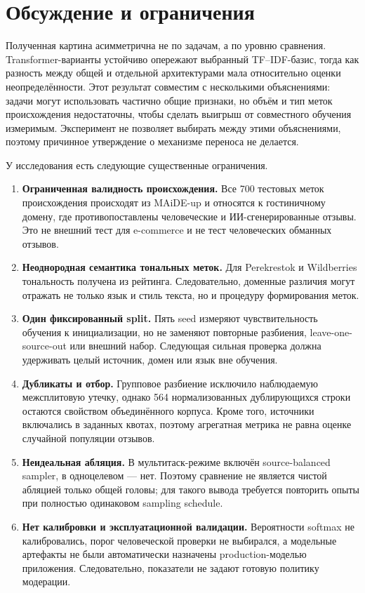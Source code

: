 \documentclass[11pt,a4paper]{article}
\begin{document}
\section{Обсуждение и ограничения}

Полученная картина асимметрична не по задачам, а по уровню сравнения. Transformer-варианты устойчиво опережают выбранный TF--IDF-базис, тогда как разность между общей и отдельной архитектурами мала относительно оценки неопределённости. Этот результат совместим с несколькими объяснениями: задачи могут использовать частично общие признаки, но объём и тип меток происхождения недостаточны, чтобы сделать выигрыш от совместного обучения измеримым. Эксперимент не позволяет выбирать между этими объяснениями, поэтому причинное утверждение о механизме переноса не делается.

У исследования есть следующие существенные ограничения.
\begin{enumerate}[leftmargin=0.65cm]
  \item \textbf{Ограниченная валидность происхождения.} Все 700 тестовых меток происхождения происходят из MAiDE-up и относятся к гостиничному домену, где противопоставлены человеческие и ИИ-сгенерированные отзывы. Это не внешний тест для e-commerce и не тест человеческих обманных отзывов.
  \item \textbf{Неоднородная семантика тональных меток.} Для Perekrestok и Wildberries тональность получена из рейтинга. Следовательно, доменные различия могут отражать не только язык и стиль текста, но и процедуру формирования меток.
  \item \textbf{Один фиксированный split.} Пять seed измеряют чувствительность обучения к инициализации, но не заменяют повторные разбиения, leave-one-source-out или внешний набор. Следующая сильная проверка должна удерживать целый источник, домен или язык вне обучения.
  \item \textbf{Дубликаты и отбор.} Групповое разбиение исключило наблюдаемую межсплитовую утечку, однако 564 нормализованных дублирующихся строки остаются свойством объединённого корпуса. Кроме того, источники включались в заданных квотах, поэтому агрегатная метрика не равна оценке случайной популяции отзывов.
  \item \textbf{Неидеальная абляция.} В мультитаск-режиме включён source-balanced sampler, в одноцелевом --- нет. Поэтому сравнение не является чистой абляцией только общей головы; для такого вывода требуется повторить опыты при полностью одинаковом sampling schedule.
  \item \textbf{Нет калибровки и эксплуатационной валидации.} Вероятности softmax не калибровались, порог человеческой проверки не выбирался, а модельные артефакты не были автоматически назначены production-моделью приложения. Следовательно, показатели не задают готовую политику модерации.
\end{enumerate}
\end{document}
